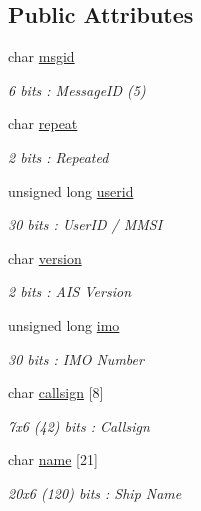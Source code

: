 \subsection*{Public Attributes}
\begin{DoxyCompactItemize}
\item 
char \mbox{\hyperlink{structaismsg__5_aa418d33fceb1bf19b3f662293abdaaf9}{msgid}}
\begin{DoxyCompactList}\small\item\em 6 bits \+: Message\+ID (5) \end{DoxyCompactList}\item 
char \mbox{\hyperlink{structaismsg__5_a6c4c5bd8281696df1a4274a7163efc96}{repeat}}
\begin{DoxyCompactList}\small\item\em 2 bits \+: Repeated \end{DoxyCompactList}\item 
unsigned long \mbox{\hyperlink{structaismsg__5_a4e2580f2c9e8a3102884194828d69110}{userid}}
\begin{DoxyCompactList}\small\item\em 30 bits \+: User\+ID / M\+M\+SI \end{DoxyCompactList}\item 
char \mbox{\hyperlink{structaismsg__5_a0043227d5365afa146a8ca3404c1f6a7}{version}}
\begin{DoxyCompactList}\small\item\em 2 bits \+: A\+IS Version \end{DoxyCompactList}\item 
unsigned long \mbox{\hyperlink{structaismsg__5_aa3c95a1bb3e2adb8749ed893a15783f8}{imo}}
\begin{DoxyCompactList}\small\item\em 30 bits \+: I\+MO Number \end{DoxyCompactList}\item 
char \mbox{\hyperlink{structaismsg__5_acf513c07ef92b555d4d36283c78b80a7}{callsign}} \mbox{[}8\mbox{]}
\begin{DoxyCompactList}\small\item\em 7x6 (42) bits \+: Callsign \end{DoxyCompactList}\item 
char \mbox{\hyperlink{structaismsg__5_a8095c03b864149d73de214ea3dfa6a9e}{name}} \mbox{[}21\mbox{]}
\begin{DoxyCompactList}\small\item\em 20x6 (120) bits \+: Ship Name \end{DoxyCompactList}\item 

\end{DoxyCompactItemize}
